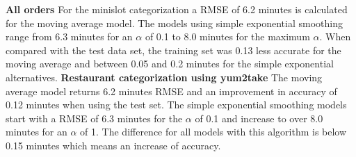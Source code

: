 \newline\newline\textbf{All orders}\newline
For the minislot categorization a RMSE of 6.2 minutes is calculated for the moving average model. The models using simple exponential smoothing range from 6.3 minutes for an $\alpha$ of 0.1 to 8.0 minutes for the maximum $\alpha$. When compared with the test data set, the training set was 0.13 less accurate for the moving average and between 0.05 and 0.2 minutes for the simple exponential alternatives.
\newline\newline\textbf{Restaurant categorization using yum2take}\newline
The moving average model returns 6.2 minutes RMSE and an improvement in accuracy of 0.12 minutes when using the test set. The simple exponential smoothing models start with a RMSE of 6.3 minutes for the $\alpha$ of 0.1 and increase to over 8.0 minutes for an $\alpha$ of 1. The difference for all models with this algorithm is below 0.15 minutes which means an increase of accuracy.
